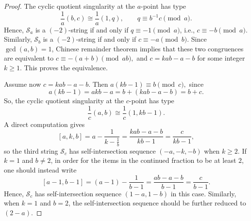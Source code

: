 \documentclass[10pt,a4paper]{amsart}
\newcommand{\st}{\mathcal{S}}
\begin{document}
\begin{proof}
The cyclic quotient singularity at the $a$-point has type
\[
\frac{1}{a}(b,c)\cong \frac{1}{a}(1,q), \qquad q\equiv b^{-1}c \pmod a.
\]
Hence, $\st_a$ is a $(-2)$-string if and only if $q\equiv -1 \pmod a$, i.e., $c\equiv -b \pmod a$.
Similarly, $\st_b$ is a $(-2)$-string if and only if
$c\equiv -a \pmod b$.
Since $\gcd(a,b)=1$, Chinese remainder theorem implies that these two congruences are equivalent to
\(
c\equiv -(a+b)\pmod{ab},
\)
and
\(
c=kab-a-b
\)
for some integer $k\ge 1$. This proves the equivalence.

Assume now $c=kab-a-b$. Then \(
a(kb-1)\equiv b \pmod c,
\)
since
\[
a(kb-1)=akb-a=b+(kab-a-b)=b+c.
\]
So, the cyclic quotient singularity at the $c$-point has type
\[
\frac{1}{c}(a,b)\cong \frac{1}{c}(1,kb-1).
\]
A direct computation gives
\[
[a,k,b]
=
a-\frac{1}{k-\frac{1}{b}}
=
\frac{kab-a-b}{kb-1}
=
\frac{c}{kb-1},
\]
so the third string $\st_c$ has self-intersection sequence $(-a,-k,-b)$ when $k\geq 2$. If $k=1$ and $b\neq 2$, in order for the items in the continued fraction to be at least $2$, one should instead write
\[[a-1,b-1]=(a-1)-\frac{1}{b-1}=\frac{ab-a-b}{b-1}=\frac{c}{b-1}.\]
Hence, $\st_c$ has self-intersection sequence $(1-a,1-b)$ in this case. Similarly, when $k=1$ and $b=2$, the self-intersection sequence should be further reduced to $(2-a)$.
\end{proof}
\end{document}
